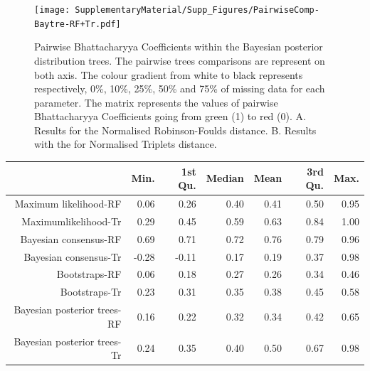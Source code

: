 \begin{figure} 
\centering
    \texttt{[image: SupplementaryMaterial/Supp\_Figures/PairwiseComp-Baytre-RF+Tr.pdf]}
\caption{Pairwise Bhattacharyya Coefficients within the Bayesian posterior distribution trees. The pairwise trees comparisons are represent on both axis. The colour gradient from white to black represents respectively, 0\%, 10\%, 25\%, 50\% and 75\% of missing data for each parameter. The matrix represents the values of pairwise Bhattacharyya Coefficients going from green (1) to red (0). A. Results for the Normalised Robinson-Foulds distance. B. Results with the for Normalised Triplets distance.}
\label{Fig_pairComp-MLbest-RF}
\end{figure} %


\begin{table}[ht]
\centering
\begin{tabular}{rrrrrrr}
  \hline
 & Min. & 1st Qu. & Median & Mean & 3rd Qu. & Max. \\ 
  \hline
  Maximum likelihood-RF & 0.06 & 0.26 & 0.40 & 0.41 & 0.50 & 0.95 \\ 
  Maximumlikelihood-Tr & 0.29 & 0.45 & 0.59 & 0.63 & 0.84 & 1.00 \\ 
  Bayesian consensus-RF & 0.69 & 0.71 & 0.72 & 0.76 & 0.79 & 0.96 \\ 
  Bayesian consensus-Tr & -0.28 & -0.11 & 0.17 & 0.19 & 0.37 & 0.98 \\ 
  Bootstraps-RF & 0.06 & 0.18 & 0.27 & 0.26 & 0.34 & 0.46 \\ 
  Bootstraps-Tr & 0.23 & 0.31 & 0.35 & 0.38 & 0.45 & 0.58 \\ 
  Bayesian posterior trees-RF & 0.16 & 0.22 & 0.32 & 0.34 & 0.42 & 0.65 \\ 
  Bayesian posterior trees-Tr & 0.24 & 0.35 & 0.40 & 0.50 & 0.67 & 0.98 \\ 
   \hline
   \hline
\end{tabular}
\end{table}